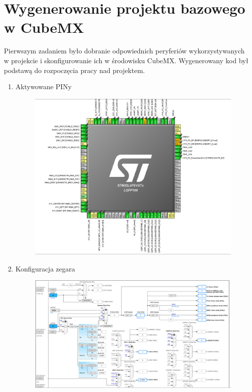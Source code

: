 \documentclass[10pt, a4paper]{article}
\begin{document}
\section{Wygenerowanie projektu bazowego w CubeMX}
Pierwszym zadaniem było dobranie odpowiednich peryferiów wykorzystywanych w projekcie i skonfigurowanie ich w środowisku CubeMX. Wygenerowany kod był podstawą do rozpoczęcia pracy nad projektem. 
\begin{enumerate}
		\item Aktywowane PINy
	\begin{figure}[H]
	\centering
	\includegraphics[width=\linewidth]{conf1.png}
	\end{figure}
	\newpage
			\item Konfiguracja zegara
	\begin{figure}[H]
	\centering
	\includegraphics[width=\linewidth]{conf2.png}
	\end{figure}

\end{enumerate}
\end{document}
